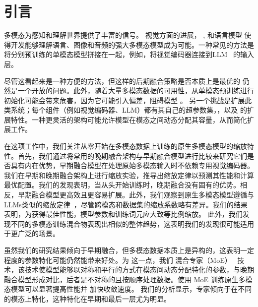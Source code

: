 
\section{引言}
\label{sec:intro}



多模态为感知和理解世界提供了丰富的信号。  
视觉方面的进展，  
\citep{radford2021learning,oquab2023dinov2,zhai2023sigmoidsiglip,fini2024multimodalaimv2},
和语言模型 \citep{achiam2023gpt4,team2023gemini,dubey2024llama3}  
使得开发能够理解语言、图像和音频的强大多模态模型成为可能。一种常见的方法是将分别预训练的单模态模型拼接在一起，例如，将视觉编码器连接到LLM~\citep{laurenccon2024mattersidefics2,shukor2023epalm,alayrac2022flamingo,
xue2024xgenblip3,beyer2024paligemma,wang2024qwen2,liu2024improvedllava,zhang2023videollama,kong2024audioflam,defossez2024moshi} 的输入层。


尽管这看起来是一种方便的方法，但这样的后期融合策略是否本质上是最优的  仍然是一个开放的问题。此外，随着大量多模态数据的可用性，从单模态预训练进行初始化可能会带来危害，因为它可能引入偏差，阻碍模型 。
另一个挑战是扩展此类系统；每个组件（例如视觉编码器、LLM）都有其自己的超参数集，，以及  的扩展特性。一种更灵活的架构可能允许模型在模态之间动态分配其容量，从而简化扩展工作。


在这项工作中，我们关注从零开始在多模态数据上训练的原生多模态模型的缩放特性。首先，我们通过将常用的晚期融合架构与早期融合模型进行比较来研究它们是否具有内在优势，早期融合模型在处理原始多模态输入时不依赖专用视觉编码器。
我们在早期和晚期融合架构上进行缩放实验，推导出缩放定律以预测其性能和计算最优配置。我们的发现表明，当从头开始训练时，晚期融合没有固有的优势。相反，早期融合模型更高效且更容易扩展。此外，我们观察到原生多模态模型遵循与LLMs类似的缩放定律~\citep{hoffmann2022training}，尽管跨模态和数据集的缩放系数略有差异。我们的结果表明，为获得最佳性能，模型参数和训练词元应大致等比例缩放。
此外，我们发现不同的多模态训练混合物表现出相似的整体趋势，这表明我们的发现很可能适用于更广泛的场景。


虽然我们的研究结果倾向于早期融合，但多模态数据本质上是异构的，这表明一定程度的参数特化可能仍然能带来好处。为  这一点，我们  混合专家（MoE）~\citep{shazeer2017outrageously} 技术，该技术使模型能够以对称和平行的方式在模态间动态分配特化的参数，与晚期融合模型形成对比，后者是不对称的且按顺序处理数据。使用 MoE 训练原生多模态模型可以显著提高性能并  加快收敛速度。 我们的分析显示，专家倾向于在不同的模态上特化，这种特化在早期和最后一层尤为明显。 





